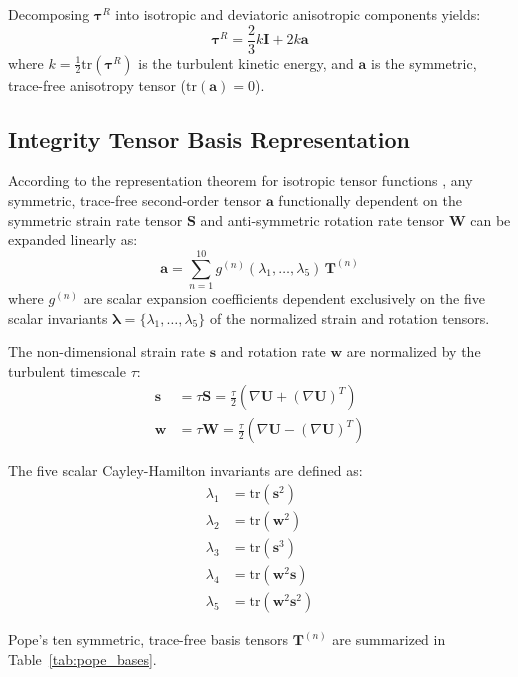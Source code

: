 \documentclass[11pt,a4paper]{article}
\begin{document}
Decomposing $\boldsymbol{\tau}^R$ into isotropic and deviatoric anisotropic components yields:
\begin{equation}
\boldsymbol{\tau}^R = \frac{2}{3}k \mathbf{I} + 2k \mathbf{a}
\end{equation}
where $k = \frac{1}{2}\mathrm{tr}(\boldsymbol{\tau}^R)$ is the turbulent kinetic energy, and $\mathbf{a}$ is the symmetric, trace-free anisotropy tensor ($\mathrm{tr}(\mathbf{a}) = 0$).

\subsection{Integrity Tensor Basis Representation}
According to the representation theorem for isotropic tensor functions \cite{pope1975more}, any symmetric, trace-free second-order tensor $\mathbf{a}$ functionally dependent on the symmetric strain rate tensor $\mathbf{S}$ and anti-symmetric rotation rate tensor $\mathbf{W}$ can be expanded linearly as:
\begin{equation}
\mathbf{a} = \sum_{n=1}^{10} g^{(n)}(\lambda_1, \dots, \lambda_5) \, \mathbf{T}^{(n)}
\label{eq:pope_expansion}
\end{equation}
where $g^{(n)}$ are scalar expansion coefficients dependent exclusively on the five scalar invariants $\boldsymbol{\lambda} = \{\lambda_1, \dots, \lambda_5\}$ of the normalized strain and rotation tensors.

The non-dimensional strain rate $\mathbf{s}$ and rotation rate $\mathbf{w}$ are normalized by the turbulent timescale $\tau$:
\begin{align}
\mathbf{s} &= \tau \mathbf{S} = \frac{\tau}{2}(\nabla \mathbf{U} + (\nabla \mathbf{U})^T) \\
\mathbf{w} &= \tau \mathbf{W} = \frac{\tau}{2}(\nabla \mathbf{U} - (\nabla \mathbf{U})^T)
\end{align}

The five scalar Cayley-Hamilton invariants are defined as:
\begin{align}
\lambda_1 &= \mathrm{tr}(\mathbf{s}^2) \\
\lambda_2 &= \mathrm{tr}(\mathbf{w}^2) \\
\lambda_3 &= \mathrm{tr}(\mathbf{s}^3) \\
\lambda_4 &= \mathrm{tr}(\mathbf{w}^2 \mathbf{s}) \\
\lambda_5 &= \mathrm{tr}(\mathbf{w}^2 \mathbf{s}^2)
\end{align}

Pope's ten symmetric, trace-free basis tensors $\mathbf{T}^{(n)}$ are summarized in Table~\ref{tab:pope_bases}.
\end{document}
